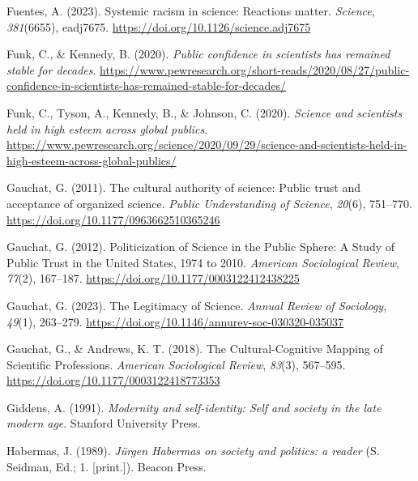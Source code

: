 \documentclass[
  jou,
  floatsintext,
  longtable,
  nolmodern,
  notxfonts,
  notimes,
  colorlinks=true,linkcolor=blue,citecolor=blue,urlcolor=blue]{apa7}
\newlength{\cslhangindent}
\newenvironment{CSLReferences}[2] %
 {\begin{list}{}{%
  \setlength{\itemindent}{0pt}
  \setlength{\leftmargin}{0pt}
  \setlength{\parsep}{0pt}
  \ifodd #1
   \setlength{\leftmargin}{\cslhangindent}
   \setlength{\itemindent}{-1\cslhangindent}
  \fi
  \setlength{\itemsep}{#2\baselineskip}}}
 {\end{list}}
\begin{document}
\begin{CSLReferences}{1}{0}
Fuentes, A. (2023). Systemic racism in science: Reactions matter.
\emph{Science}, \emph{381}(6655), eadj7675.
\url{https://doi.org/10.1126/science.adj7675}

Funk, C., \& Kennedy, B. (2020). \emph{Public confidence in scientists
has remained stable for decades}.
\url{https://www.pewresearch.org/short-reads/2020/08/27/public-confidence-in-scientists-has-remained-stable-for-decades/}

Funk, C., Tyson, A., Kennedy, B., \& Johnson, C. (2020). \emph{Science
and scientists held in high esteem across global publics}.
\url{https://www.pewresearch.org/science/2020/09/29/science-and-scientists-held-in-high-esteem-across-global-publics/}

Gauchat, G. (2011). The cultural authority of science: Public trust and
acceptance of organized science. \emph{Public Understanding of Science},
\emph{20}(6), 751--770. \url{https://doi.org/10.1177/0963662510365246}

Gauchat, G. (2012). Politicization of Science in the Public Sphere: A
Study of Public Trust in the United States, 1974 to 2010. \emph{American
Sociological Review}, \emph{77}(2), 167--187.
\url{https://doi.org/10.1177/0003122412438225}

Gauchat, G. (2023). The Legitimacy of Science. \emph{Annual Review of
Sociology}, \emph{49}(1), 263--279.
\url{https://doi.org/10.1146/annurev-soc-030320-035037}

Gauchat, G., \& Andrews, K. T. (2018). The Cultural-Cognitive Mapping of
Scientific Professions. \emph{American Sociological Review},
\emph{83}(3), 567--595. \url{https://doi.org/10.1177/0003122418773353}

Giddens, A. (1991). \emph{Modernity and self-identity: Self and society
in the late modern age}. Stanford University Press.

Habermas, J. (1989). \emph{Jürgen Habermas on society and politics: a
reader} (S. Seidman, Ed.; 1. {[}print.{]}). Beacon Press.


\end{CSLReferences}
\end{document}
